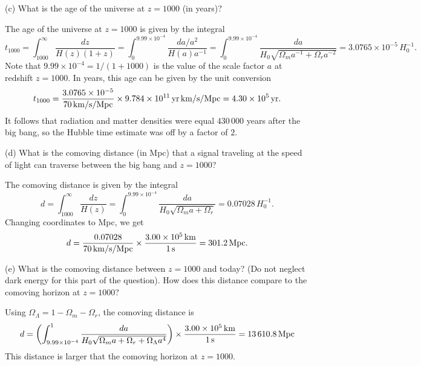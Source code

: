 \documentclass{lkx_pset}
\begin{document}
\begin{parts}
	\begin{part}{(c)}
		What is the age of the universe at $z=1000$ (in years)?
	\end{part}

	The age of the universe at $z=1000$ is given by the integral
	\[
		t_{1000} = \int_{1000}^\infty \frac{dz}{H(z)(1+z)} = \int_0^{9.99\times 10^{-4}}\frac{da/a^2}{H(a)a^{-1}} = \int_0^{9.99\times 10^{-4}}\frac{da}{H_0\sqrt{\Omega_m a^{-1} + \Omega_r a^{-2}}} = 3.0765\times 10^{-5}\,H_0^{-1}.
	\]
	Note that $9.99\times 10^{-4}=1/(1+1000)$ is the value of the scale factor $a$ at redshift $z=1000$. In years, this age can be given by the unit conversion
	\[
		t_{1000}=\frac{3.0765\times 10^{-5}}{\Hsi{70}}\times \Hyrsi{9.784e11}=\yrsi{4.30e5}.
	\]
	It follows that radiation and matter densities were equal $430\,000$ years after the big bang, so the Hubble time estimate was off by a factor of $2$.

	\begin{part}{(d)}
		What is the comoving distance (in Mpc) that a signal traveling at the speed of light can traverse between the big bang and $z=1000$?
	\end{part}

	The comoving distance is  given by the integral
	\[
		d=\int_{1000}^\infty \frac{dz}{H(z)} = \int_0^{9.99\times 10^{-4}}\frac{da}{H_0\sqrt{\Omega_m a + \Omega_r}} = 0.07028\,H_0^{-1}.
	\]
	Changing coordinates to Mpc, we get
	\[
		d = \frac{0.07028}{\Hsi{70}}\times \frac{\kmsi{3.00e5}}{\ssi{1}}=\Mpcsi{301.2}.
	\]

	\begin{part}{(e)}
		What is the comoving distance between $z=1000$ and today? (Do not neglect dark energy for this part of the question). How does this distance compare to the comoving horizon at $z=1000$?
	\end{part}

	Using $\Omega_\Lambda = 1-\Omega_m - \Omega_r$, the comoving distance is
	\[
		d = \left(\int_{9.99\times 10^{-4}}^1 \frac{da}{H_0\sqrt{\Omega_m a + \Omega_r + \Omega_\Lambda a^4}}\right)\times \frac{\kmsi{3.00e5}}{\ssi{1}} = \Mpcsi{13610.8}
	\]
	This distance is larger that the comoving horizon at $z=1000$.
\end{parts}
\end{document}

